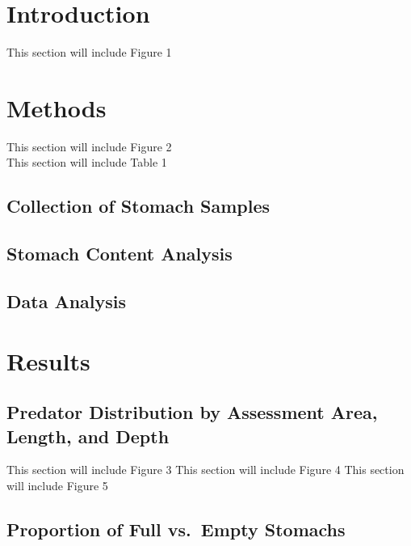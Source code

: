 \documentclass[
]{article}
\begin{document}
\hypertarget{introduction}{%
\section{Introduction}\label{introduction}}

This section will include Figure 1

\hypertarget{methods}{%
\section{Methods}\label{methods}}

This section will include Figure 2\\
This section will include Table 1

\hypertarget{collection-of-stomach-samples}{%
\subsection{Collection of Stomach
Samples}\label{collection-of-stomach-samples}}

\hypertarget{stomach-content-analysis}{%
\subsection{Stomach Content Analysis}\label{stomach-content-analysis}}

\hypertarget{data-analysis}{%
\subsection{Data Analysis}\label{data-analysis}}

\hypertarget{results}{%
\section{Results}\label{results}}

\hypertarget{predator-distribution-by-assessment-area-length-and-depth}{%
\subsection{Predator Distribution by Assessment Area, Length, and
Depth}\label{predator-distribution-by-assessment-area-length-and-depth}}

This section will include Figure 3 This section will include Figure 4
This section will include Figure 5

\hypertarget{proportion-of-full-vs.-empty-stomachs}{%
\subsection{Proportion of Full vs.~Empty
Stomachs}\label{proportion-of-full-vs.-empty-stomachs}}
\end{document}
